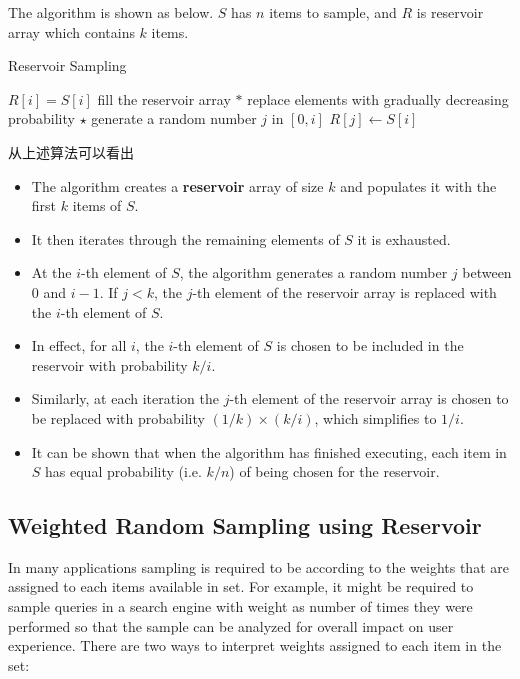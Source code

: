 The algorithm is shown as below. $S$ has $n$ items to sample, and $R$ is reservoir array which contains $k$ items.
\setcounter{algorithm}{0}
\begin{algorithm}[H]
\caption{Reservoir Sampling}
\begin{algorithmic}[1]
\State $R[i] = S[i]$ \Comment fill the reservoir array
\EndFor
\State $\ast$ replace elements with gradually decreasing probability
\State $\star$ generate a random number $j$ in $[0, i]$
\State $R[j]\gets S[i]$
\EndIf
\EndFor
\EndProcedure
\end{algorithmic}
\end{algorithm}
从上述算法可以看出
\begin{itemize}
\item The algorithm creates a\textbf{ reservoir} array of size $k$ and populates it with the first $k$ items of $S$. 
\item It then iterates through the remaining elements of $S$ it is exhausted.
\item At the $ i $-th element of $S$, the algorithm generates a random number $j$ between 0 and $i-1$. If $j<k$, the $j$-th element of the reservoir array is replaced with the $ i $-th element of $ S $. 
\item In effect, for all $i$, the $i$-th element of $S$ is chosen to be included in the reservoir with probability $k/i$.
\item Similarly, at each iteration the $j$-th element of the reservoir array is chosen to be replaced with probability $(1/k)\times (k/i)$, which simplifies to $1/i$.
\item It can be shown that when the algorithm has finished executing, each item in $ S $ has equal probability (i.e. $k/n$) of being chosen for the reservoir.
\end{itemize}

\subsection{Weighted Random Sampling using Reservoir}
In many applications sampling is required to be according to the weights that are assigned to each items available in set. For example, it might be required to sample queries in a search engine with weight as number of times they were performed so that the sample can be analyzed for overall impact on user experience. There are two ways to interpret weights assigned to each item in the set:

